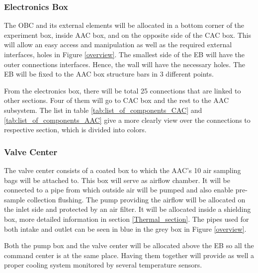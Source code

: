 \subsubsection{Electronics Box}

The OBC and its external elements will be allocated in a bottom corner of the experiment box, inside AAC box, and on the opposite side of the CAC box. This will allow an easy access and manipulation as well as the required external interfaces, holes in Figure \ref{overview}. The smallest side of the EB will have the outer connections interfaces. Hence, the wall will have the necessary holes. The EB will be fixed to the AAC box structure bars in 3 different points.

From the electronics box, there will be total 25 connections that are linked to other sections. Four of them will go to CAC box and the rest to the AAC subsystem. The list in table \ref{tab:list_of_components_CAC} and \ref{tab:list_of_components_AAC} give a more clearly view over the connections to respective section, which is divided into colors. 







\subsubsection{Valve Center}

The valve center consists of a coated box to which the AAC's 10 air sampling bags will be attached to. This box will serve as airflow chamber. It will be connected to a pipe from which outside air will be pumped and also enable pre-sample collection flushing. The pump providing the airflow will be allocated on the inlet side and protected by an air filter. It will be allocated inside a shielding box, more detailed information in section \ref{Thermal_section}. The pipes used for both intake and outlet can be seen in blue in the grey box in Figure \ref{overview}.

\smallskip
Both the pump box and the valve center will be allocated above the EB so all the command center is at the same place. Having them together will provide as well a proper cooling system monitored by several temperature sensors. %


